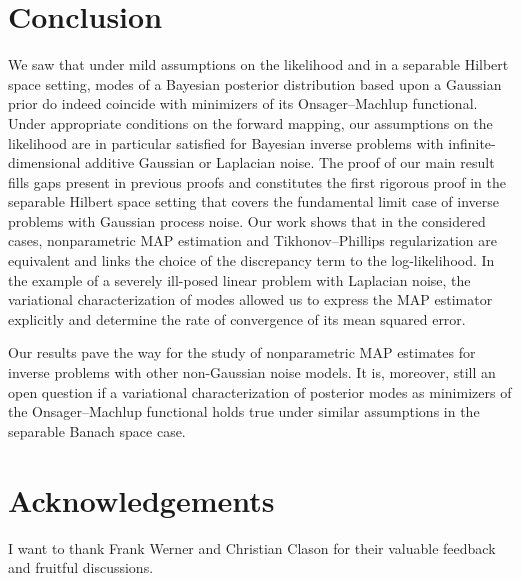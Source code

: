 \documentclass[english]{jnsao}
\theoremstyle{definition}
\begin{document}

\section*{Conclusion}

We saw that under mild assumptions on the likelihood and in a separable Hilbert space setting, modes of a Bayesian posterior distribution based upon a Gaussian prior do indeed coincide with minimizers of its Onsager--Machlup functional. Under appropriate conditions on the forward mapping, our assumptions on the likelihood are in particular satisfied for Bayesian inverse problems with infinite-dimensional additive Gaussian or Laplacian noise. The proof of our main result fills gaps present in previous proofs and constitutes the first rigorous proof in the separable Hilbert space setting that covers the fundamental limit case of inverse problems with Gaussian process noise. 
Our work shows that in the considered cases, nonparametric MAP estimation and Tikhonov--Phillips regularization are equivalent and links the choice of the discrepancy term to the log-likelihood.
In the example of a severely ill-posed linear problem with Laplacian noise, the variational characterization of modes allowed us to express the MAP estimator explicitly and determine the rate of convergence of its mean squared error.

Our results pave the way for the study of nonparametric MAP estimates for inverse problems with other non-Gaussian noise models. It is, moreover, still an open question if a variational characterization of posterior modes as minimizers of the Onsager--Machlup functional holds true under similar assumptions in the separable Banach space case.

\section*{Acknowledgements}

I want to thank Frank Werner and Christian Clason for their valuable feedback and fruitful discussions.






\end{document}

